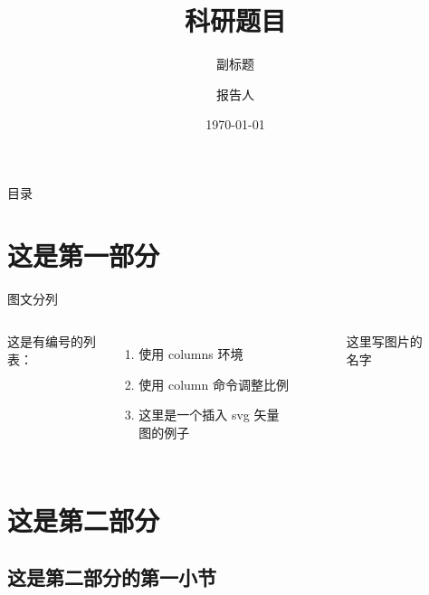 \documentclass[aspectratio=169]{beamer}
\title{科研题目}
\subtitle{副标题} %
\author{报告人}
\institute{控制与计算机工程学院}
\date{\today}
\begin{document}
\begin{frame}[noframenumbering]

    \titlepage

\end{frame}

\begin{frame}{目录}

    \centering
    \begin{minipage}{0.8\textwidth}
        \tableofcontents
    \end{minipage}

\end{frame}


\section{这是第一部分}

\begin{frame}{图文分列}

    \begin{columns}

        这是有编号的列表：
        \begin{enumerate}
            \item 使用 columns 环境
            \item 使用 column 命令调整比例
            \item 这里是一个插入 svg 矢量图的例子
        \end{enumerate}


        \begin{figure}
            \centering
            
            \caption{这里写图片的名字}
        \end{figure}

    \end{columns}

\end{frame}

\section{这是第二部分}

\subsection{这是第二部分的第一小节}
\end{document}
